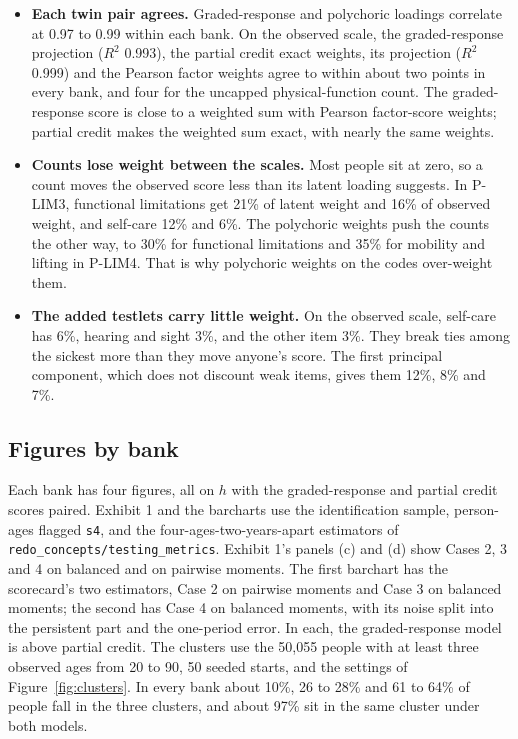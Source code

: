 \documentclass[11pt]{article}
\newcommand{\code}[1]{\texttt{\small #1}}
\begin{document}
\begin{itemize}\itemsep2pt
\item \textbf{Each twin pair agrees.} Graded-response and polychoric loadings
correlate at 0.97 to 0.99 within each bank. On the observed scale, the
graded-response projection ($R^2$ 0.993), the partial credit exact weights,
its projection ($R^2$ 0.999) and the Pearson factor weights agree to within
about two points in every bank, and four for the uncapped physical-function
count. The graded-response score is close to a weighted sum with Pearson
factor-score weights; partial credit makes the weighted sum exact, with nearly
the same weights.
\item \textbf{Counts lose weight between the scales.} Most people sit at
zero, so a count moves the observed score less than its latent loading
suggests. In P-LIM3, functional limitations get 21\% of latent weight and
16\% of observed weight, and self-care 12\% and 6\%. The polychoric weights
push the counts the other way, to 30\% for functional limitations and 35\%
for mobility and lifting in P-LIM4. That is why polychoric weights on the
codes over-weight them.
\item \textbf{The added testlets carry little weight.} On the observed scale,
self-care has 6\%, hearing and sight 3\%, and the other item 3\%. They break
ties among the sickest more than they move anyone's score. The first
principal component, which does not discount weak items, gives them 12\%,
8\% and 7\%.
\end{itemize}





\subsection{Figures by bank}
Each bank has four figures, all on $h$ with the graded-response and partial
credit scores paired. Exhibit 1 and the barcharts use the identification
sample, person-ages flagged \code{s4}, and the four-ages-two-years-apart
estimators of \code{redo\_concepts/testing\_metrics}. Exhibit 1's panels (c)
and (d) show Cases 2, 3 and 4 on balanced and on pairwise moments. The first
barchart has the scorecard's two estimators, Case 2 on pairwise moments and
Case 3 on balanced moments; the second has Case 4 on balanced moments, with
its noise split into the persistent part and the one-period error. In each,
the graded-response model is above partial credit. The clusters use the 50{,}055
people with at least three observed ages from 20 to 90, 50 seeded starts, and
the settings of Figure~\ref{fig:clusters}. In every bank about 10\%, 26 to
28\% and 61 to 64\% of people fall in the three clusters, and about 97\% sit
in the same cluster under both models.
\end{document}
